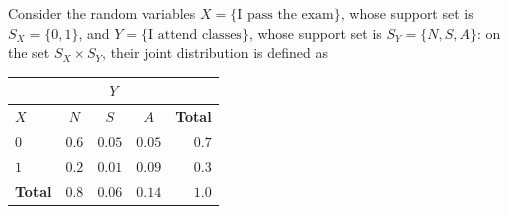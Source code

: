 \documentclass{report}
\begin{document}
\begin{examplebox}
    Consider the random variables $\displaystyle X = \{\text{I pass the exam}\}$, whose support set is $\displaystyle S_X = \{0, 1\}$, and $\displaystyle Y = \{\text{I attend classes}\}$, whose support set is $\displaystyle S_Y = \{N, S, A\}$: on the set $\displaystyle S_X \times S_Y$, their joint distribution is defined as
    
    {\centering
    \vspace{0.5em}
    \begin{tabular}{|l|c c c|r|}
        \hline
        & \multicolumn{3}{c|}{$Y$} & \\
        \hline
        $X$ & $N$ & $S$ & $A$ & \textbf{Total} \\
        \hline
        $0$ & $0.6$ & $0.05$ & $0.05$ & $0.7$ \\
        $1$ & $0.2$ & $0.01$ & $0.09$ & $0.3$ \\
        \hline
        \textbf{Total} & $0.8$ & $0.06$ & $0.14$ & $1.0$ \\
        \hline
    \end{tabular}
    \vspace{0.5em}\par}
    

\end{examplebox}
\end{document}

